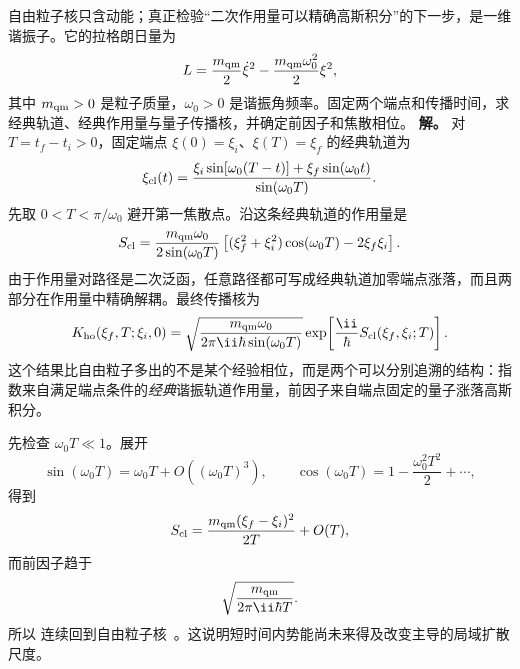 
\begin{exbox}[谐振子传播核]
自由粒子核只含动能；真正检验“二次作用量可以精确高斯积分”的下一步，是一维谐振子。它的拉格朗日量为
\begin{equation}
 {L=\frac{m_{\rm qm}}2\dot\xi^2
 -\frac{m_{\rm qm}\omega_0^2}{2}\xi^2,}
 \label{eq:harmonic-lagrangian-dp68}
\end{equation}
其中 $m_{\rm qm}>0$ 是粒子质量，$\omega_0>0$ 是谐振角频率。固定两个端点和传播时间，求经典轨道、经典作用量与量子传播核，并确定前因子和焦散相位。
\textbf{解。} 对 $T=t_f-t_i>0$，固定端点 $\xi(0)=\xi_i$、$\xi(T)=\xi_f$ 的经典轨道为
\begin{equation}
 {
 \xi_{\rm cl}(t)
 =\frac{\xi_i\sin[\omega_0(T-t)]
 +\xi_f\sin(\omega_0t)}{\sin(\omega_0T)}.}
 \label{eq:harmonic-classical-path-dp64}
\end{equation}
先取 $0<T<\pi/\omega_0$ 避开第一焦散点。沿这条经典轨道的作用量是
\begin{equation}
 {
 S_{\rm cl}
 =\frac{m_{\rm qm}\omega_0}{2\sin(\omega_0T)}
 \left[
 (\xi_f^2+\xi_i^2)\cos(\omega_0T)-2\xi_f\xi_i
 \right].}
 \label{eq:harmonic-classical-action-dp64}
\end{equation}
由于作用量对路径是二次泛函，任意路径都可写成经典轨道加零端点涨落，而且两部分在作用量中精确解耦。最终传播核为
\begin{equation}
 {
 K_{\rm ho}(\xi_f,T;\xi_i,0)
 =\sqrt{\frac{m_{\rm qm}\omega_0}
 {2\pi\ii\hbar\sin(\omega_0T)}}
 \exp\!\left[\frac{\ii}{\hbar}S_{\rm cl}(\xi_f,\xi_i;T)\right].}
 \label{eq:harmonic-kernel-dp64}
\end{equation}
这个结果比自由粒子多出的不是某个经验相位，而是两个可以分别追溯的结构：指数来自满足端点条件的\emph{经典}谐振轨道作用量，前因子来自端点固定的量子涨落高斯积分。

先检查 $\omega_0T\ll1$。展开
\begin{equation*}
 \sin(\omega_0T)=\omega_0T+O((\omega_0T)^3),
 \qquad
 \cos(\omega_0T)=1-\frac{\omega_0^2T^2}{2}+\cdots,
\end{equation*}
得到
\begin{equation*}
 S_{\rm cl}
 =\frac{m_{\rm qm}(\xi_f-\xi_i)^2}{2T}
 +O(T),
\end{equation*}
而前因子趋于
\begin{equation*}
 \sqrt{\frac{m_{\rm qm}}{2\pi\ii\hbar T}}.
\end{equation*}
所以 连续回到自由粒子核~。这说明短时间内势能尚未来得及改变主导的局域扩散尺度。


\end{exbox}
